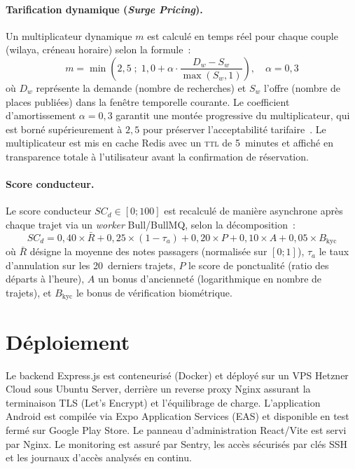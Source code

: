 \paragraph{Tarification dynamique (\textit{Surge Pricing}).} Un multiplicateur dynamique $m$ est calculé en temps réel pour chaque couple (wilaya, créneau horaire) selon la formule~:
$$m = \min\!\left(2{,}5\;; \; 1{,}0 + \alpha \cdot \frac{D_w - S_w}{\max(S_w, 1)}\right), \quad \alpha = 0{,}3$$
où $D_w$ représente la demande (nombre de recherches) et $S_w$ l'offre (nombre de places publiées) dans la fenêtre temporelle courante. Le coefficient d'amortissement $\alpha = 0{,}3$ garantit une montée progressive du multiplicateur, qui est borné supérieurement à $2{,}5$ pour préserver l'acceptabilité tarifaire~\cite{si2023what}. Le multiplicateur est mis en cache Redis avec un \textsc{ttl} de 5~minutes et affiché en transparence totale à l'utilisateur avant la confirmation de réservation.

\paragraph{Score conducteur.} Le score conducteur $SC_d \in [0; 100]$ est recalculé de manière asynchrone après chaque trajet via un \textit{worker} Bull/BullMQ, selon la décomposition~:
$$SC_d = 0{,}40 \times \bar{R} + 0{,}25 \times (1 - \tau_a) + 0{,}20 \times P + 0{,}10 \times A + 0{,}05 \times B_{\text{kyc}}$$
où $\bar{R}$ désigne la moyenne des notes passagers (normalisée sur $[0; 1]$), $\tau_a$ le taux d'annulation sur les 20~derniers trajets, $P$ le score de ponctualité (ratio des départs à l'heure), $A$ un bonus d'ancienneté (logarithmique en nombre de trajets), et $B_{\text{kyc}}$ le bonus de vérification biométrique.


\section{Déploiement}
\label{sec:deploiement}

Le backend Express.js est conteneurisé (Docker) et déployé sur un VPS Hetzner Cloud sous Ubuntu Server, derrière un reverse proxy Nginx assurant la terminaison TLS (Let's Encrypt) et l'équilibrage de charge. L'application Android est compilée via Expo Application Services (EAS) et disponible en test fermé sur Google Play Store. Le panneau d'administration React/Vite est servi par Nginx. Le monitoring est assuré par Sentry, les accès sécurisés par clés SSH et les journaux d'accès analysés en continu.

